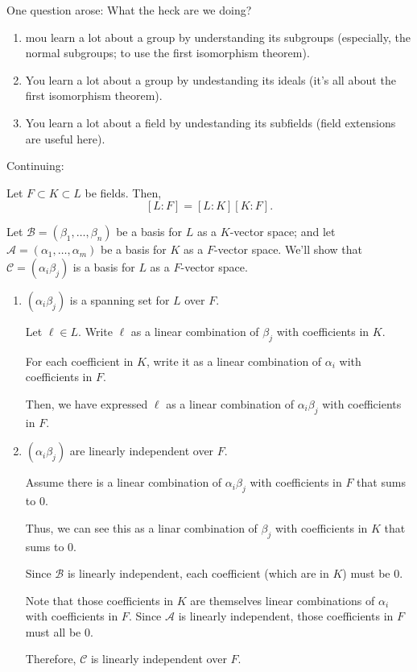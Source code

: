 
One question arose: What the heck are we doing?

\begin{enumerate}
	\item mou learn a lot about a group by understanding its subgroups (especially, the normal subgroups; to use the first isomorphism theorem).
	\item You learn a lot about a group by undestanding its ideals (it's all about the first isomorphism theorem).
	\item You learn a lot about a field by undestanding its subfields (field extensions are useful here).
\end{enumerate}

Continuing:

\begin{thm}
	Let $F \subset K \subset L$ be fields. Then, \[[L : F] = [L : K][K : F].\]
\end{thm}

\begin{dem}
	Let $\mathcal{B} = (\beta_1, \dots, \beta_n)$ be a basis for $L$ as a $K$-vector space; and let $\mathcal{A} = (\alpha_1, \dots, \alpha_m)$ be a basis for  $K$ as a $F$-vector space. We'll show that $\mathcal{C} = (\alpha_i \beta_j)$ is a basis for $L$ as a $F$-vector space.

	\begin{enumerate}
		\item $(\alpha_i \beta_j)$ is a spanning set for $L$ over $F$.

			Let $\ell \in L$. Write $\ell$ as a linear combination of $\beta_j$ with coefficients in $K$.

			For each coefficient in $K$, write it as a linear combination of $\alpha_i$ with coefficients in $F$.

			Then, we have expressed $\ell$ as a linear combination of $\alpha_i \beta_j$ with coefficients in $F$.

		\item $(\alpha_i \beta_j)$  are linearly independent over $F$.

			Assume there is a linear combination of $\alpha_i \beta_j$ with coefficients in $F$ that sums to $0$.

			Thus, we can see this as a linar combination of $\beta_j$ with coefficients in $K$ that sums to $0$.

			Since $\mathcal{B}$ is linearly independent, each coefficient (which are in $K$) must be $0$.

			Note that those coefficients in $K$ are themselves linear combinations of $\alpha_i$ with coefficients in $F$.
			Since $\mathcal{A}$ is linearly independent, those coefficients in $F$ must all be $0$.

			Therefore, $\mathcal{C}$ is linearly independent over $F$.
	\end{enumerate}
\end{dem}
